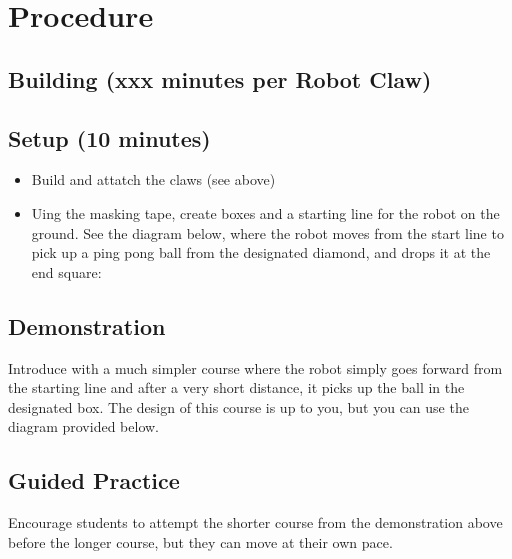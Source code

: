 \documentclass{lessonplan}
\begin{document}
\section{Procedure}
\subsection{Building (xxx minutes per Robot Claw)}
\subsection{Setup (10 minutes)}
\begin{itemize}
	\item Build and attatch the claws (see above)
	\item Uing the masking tape, create boxes and a starting line for the robot on the ground. See the diagram below, where the robot moves from the start line to pick up a ping pong ball from the designated diamond, and drops it at the end square: \newline
	      \begin{center}
	      \end{center}

\end{itemize}
\subsection{Demonstration}
Introduce with a much simpler course where the robot simply goes forward from the starting line and after a very short distance, it picks up the ball in the designated box. The design of this course is up to you, but you can use the diagram provided below.\newline
\begin{center}
\end{center}
\subsection{Guided Practice}
Encourage students to attempt the shorter course from the demonstration above before the longer course, but they can move at their own pace.
\end{document}
